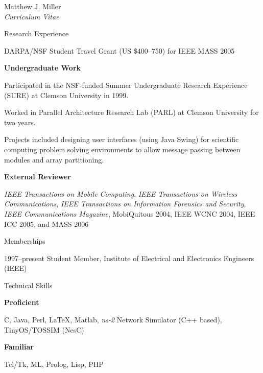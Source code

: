 \documentclass[10pt]{article}
\newenvironment{sublist}{%
	\begin{list}{}{%
		\setlength{\itemsep}{0em}\setlength{\parsep}{0em}%
		\setlength{\topsep}{0em}\setlength{\parskip}{0em}%
	}%
}%
{ \end{list} }
\newenvironment{subbulletlist}{%
	\begin{list}{\labelitemii}{%
		\setlength{\topsep}{\itemsep}\setlength{\parskip}{\parsep}%
	}%
}%
{ \end{list} }
\begin{document}
\begin{cv}{Matthew J. Miller\\{\large \itshape Curriculum Vitae}}
\begin{cvlist}{Research Experience}
\begin{subbulletlist}
		\item DARPA/NSF Student Travel Grant (US \$400--750) for IEEE MASS 2005
	\end{subbulletlist}
	\item \textbf{Undergraduate Work}
	\begin{subbulletlist}
		\item Participated in the NSF-funded Summer Undergraduate 
		Research Experience (SURE) at Clemson University in 1999.
		\item Worked in Parallel Architecture Research Lab (PARL) 
		at Clemson University for two years.
		\item Projects included designing user interfaces (using Java Swing)
		for scientific
		computing problem solving environments to allow message passing
		between modules and array partitioning.
	\end{subbulletlist}
	\item \textbf{External Reviewer}
	\begin{sublist}
		\item \textit{IEEE Transactions on Mobile Computing}, 
		\textit{IEEE Transactions on Wireless Communications}, 
		\textit{IEEE Transactions on Information Forensics and
		Security}, \textit{IEEE Communications Magazine}, 
		MobiQuitous 2004, IEEE WCNC 2004, IEEE ICC 2005, and MASS 2006  
	\end{sublist}
\end{cvlist}
\setlength{\cvlabelwidth}{\oldcvlabelwidth}

\begin{cvlist}{Memberships}
	\item[1997--present] Student Member, Institute of Electrical and
	Electronics Engineers (IEEE)
\end{cvlist}

\setlength{\oldcvlabelwidth}{\cvlabelwidth}
\setlength{\cvlabelwidth}{1em}
\begin{cvlist}{Technical Skills}
	\item \textbf{Proficient}
	\begin{sublist}
		\item C, Java, Perl, LaTeX, Matlab, 
		\textit{ns-2} Network Simulator (C++ based), TinyOS/TOSSIM (NesC)
	\end{sublist}
	\item \textbf{Familiar} 
	\begin{sublist}
		\item Tcl/Tk, ML, Prolog, Lisp, PHP
	\end{sublist}
\end{cvlist}
\setlength{\cvlabelwidth}{\oldcvlabelwidth}


\end{cv}
\end{document}
